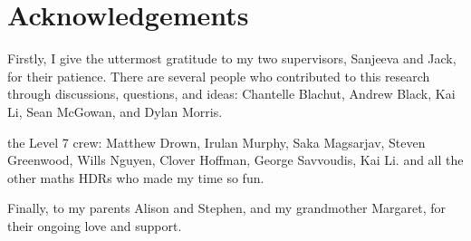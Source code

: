 \chapter{Acknowledgements}
\label{ch:acknowledgements}

Firstly, I give the uttermost gratitude to my two supervisors, Sanjeeva and Jack, for their patience.
There are several people who contributed to this research through discussions, questions, and ideas: Chantelle Blachut, Andrew Black, Kai Li, Sean McGowan, and Dylan Morris.



the Level 7 crew: Matthew Drown, Irulan Murphy, Saka Magsarjav, Steven Greenwood, Wills Nguyen, Clover Hoffman, George Savvoudis, Kai Li.
and all the other maths HDRs who made my time so fun.

Finally, to my parents Alison and Stephen, and my grandmother Margaret, for their ongoing love and support.
